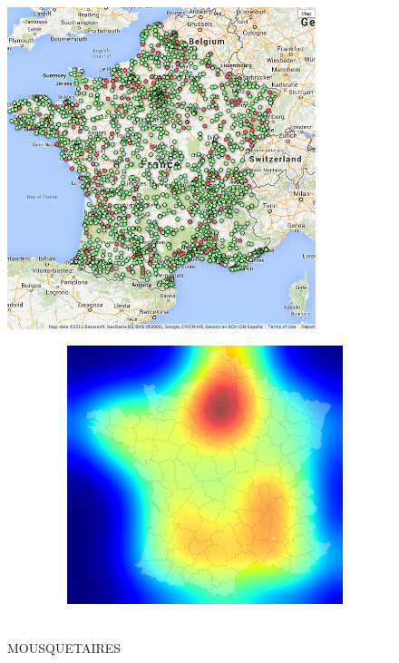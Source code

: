 \documentclass[11pt]{article}
\begin{document}
\begin{figure}[H]
    \caption{MOUSQUETAIRES}
	\centering
		\includegraphics[width=9cm]{images/maps_group_dots/MOUSQUETAIRES.png}
        \includegraphics[width=12.8cm]{images/maps_group_heatmaps/MOUSQUETAIRES.png}
\end{figure}
\end{document}

